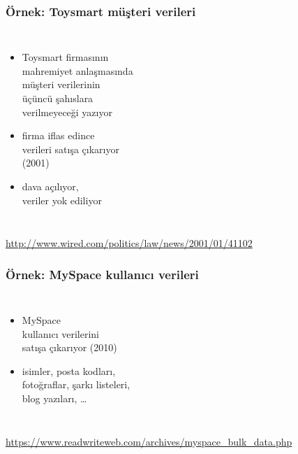 \documentclass[dvipsnames]{beamer}
\theoremstyle{plain}
\begin{document}
\begin{frame}
  \frametitle{Örnek: Toysmart müşteri verileri}

  \begin{columns}

    \begin{itemize}
      \item Toysmart firmasının\\
        mahremiyet anlaşmasında\\
        müşteri verilerinin\\
        üçüncü şahıslara\\
        verilmeyeceği yazıyor
      \item firma iflas edince\\
        verileri satışa çıkarıyor\\
        (2001)
      \item dava açılıyor,\\
        veriler yok ediliyor
    \end{itemize}
  \end{columns}

  \medskip
  \tiny{\url{http://www.wired.com/politics/law/news/2001/01/41102}}\\
\end{frame}

\begin{frame}
  \frametitle{Örnek: MySpace kullanıcı verileri}

  \begin{columns}

    \begin{itemize}
      \item MySpace\\
        kullanıcı verilerini\\
        satışa çıkarıyor (2010)
      \item isimler, posta kodları,\\
        fotoğraflar, şarkı listeleri,\\
        blog yazıları, \ldots
    \end{itemize}
  \end{columns}

  \medskip
  \tiny{\url{https://www.readwriteweb.com/archives/myspace_bulk_data.php}}\\
\end{frame}
\end{document}
